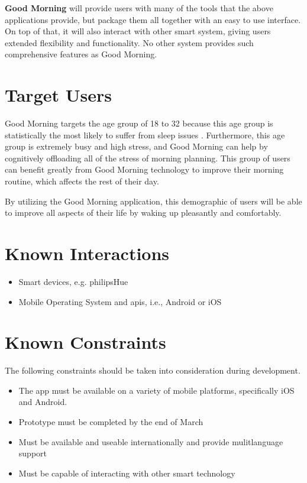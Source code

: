 \documentclass[11pt]{article}
\begin{document}
\textbf{Good Morning} will provide users with many of the tools that the above applications provide, but package them all together with an easy to use interface. On top of that, it will also interact with other smart system, giving users extended flexibility and functionality. No other system provides such comprehensive features as Good Morning.

\section{Target Users}\label{target-users}

Good Morning targets the age group of 18 to 32 because this age group is statistically the most likely to suffer from sleep issues \cite{sleepdisorders}. Furthermore, this age group is extremely busy and high stress, and Good Morning can help by cognitively offloading all of the stress of morning planning. This group of users can benefit greatly from Good Morning technology to improve their morning routine, which affects the rest of their day.

By utilizing the Good Morning application, this demographic of users will be able to improve all aspects of their life by waking up pleasantly and comfortably.

%
\section{Known Interactions}\label{known-interactions}

\begin{itemize}
\item
  Smart devices, e.g. \gls{philipsHue}
\item
  Mobile Operating System and \glspl{api}, i.e., Android or iOS
\end{itemize}


%
\section{Known Constraints}\label{known-constraints}

The following constraints should be taken into consideration during development.

\begin{itemize}
 \item The app must be available on a variety of mobile platforms, specifically iOS and Android.
 \item Prototype must be completed by the end of March
 \item Must be available and useable internationally and provide mulitlanguage support
 \item Must be capable of interacting with other smart technology
\end{itemize}
\end{document}
